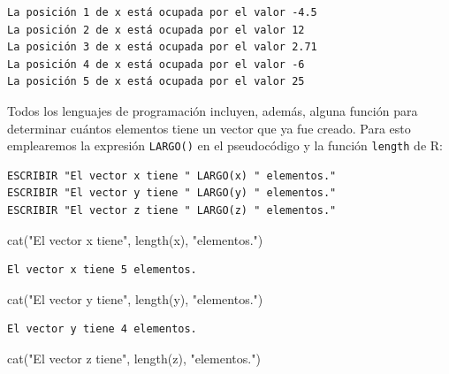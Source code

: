 \documentclass[
]{book}
\newenvironment{Shaded}{\begin{snugshade}}{\end{snugshade}}
\newcommand{\FunctionTok}[1]{\textcolor[rgb]{0.00,0.00,0.00}{#1}}
\newcommand{\NormalTok}[1]{#1}
\newcommand{\StringTok}[1]{\textcolor[rgb]{0.31,0.60,0.02}{#1}}
\begin{document}
\begin{verbatim}
La posición 1 de x está ocupada por el valor -4.5 
La posición 2 de x está ocupada por el valor 12 
La posición 3 de x está ocupada por el valor 2.71 
La posición 4 de x está ocupada por el valor -6 
La posición 5 de x está ocupada por el valor 25 
\end{verbatim}

Todos los lenguajes de programación incluyen, además, alguna función para determinar cuántos elementos tiene un vector que ya fue creado. Para esto emplearemos la expresión \texttt{LARGO()} en el pseudocódigo y la función \texttt{length} de R:

\begin{verbatim}
ESCRIBIR "El vector x tiene " LARGO(x) " elementos."
ESCRIBIR "El vector y tiene " LARGO(y) " elementos."
ESCRIBIR "El vector z tiene " LARGO(z) " elementos."
\end{verbatim}

\begin{Shaded}
\begin{Highlighting}[]
\FunctionTok{cat}\NormalTok{(}\StringTok{"El vector x tiene"}\NormalTok{, }\FunctionTok{length}\NormalTok{(x), }\StringTok{"elementos."}\NormalTok{)}
\end{Highlighting}
\end{Shaded}

\begin{verbatim}
El vector x tiene 5 elementos.
\end{verbatim}

\begin{Shaded}
\begin{Highlighting}[]
\FunctionTok{cat}\NormalTok{(}\StringTok{"El vector y tiene"}\NormalTok{, }\FunctionTok{length}\NormalTok{(y), }\StringTok{"elementos."}\NormalTok{)}
\end{Highlighting}
\end{Shaded}

\begin{verbatim}
El vector y tiene 4 elementos.
\end{verbatim}

\begin{Shaded}
\begin{Highlighting}[]
\FunctionTok{cat}\NormalTok{(}\StringTok{"El vector z tiene"}\NormalTok{, }\FunctionTok{length}\NormalTok{(z), }\StringTok{"elementos."}\NormalTok{)}
\end{Highlighting}
\end{Shaded}
\end{document}
